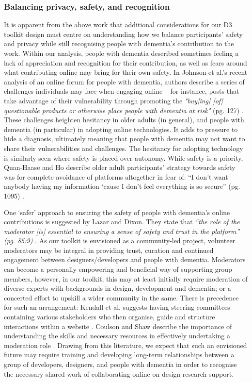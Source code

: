 \subsubsection{Balancing privacy, safety, and recognition}
It is apparent from the above work that additional considerations for our D3 toolkit design must centre on understanding how we balance participants’ safety and privacy while still recognising people with dementia's contribution to the work. Within our analysis, people with dementia described sometimes feeling a lack of appreciation and recognition for their contribution, as well as fears around what contributing online may bring for their own safety. In Johnson et al.’s recent analysis of an online forum for people with dementia, authors describe a series of challenges individuals may face when engaging online – for instance, posts that take advantage of their vulnerability through promoting the \textit{"buy[ing] [of] questionable products or otherwise place people with dementia at risk"} (pg. 127) \citep{johnson2020roles}. These challenges heighten hesitancy in older adults (in general), and people with dementia (in particular) in adopting online technologies. It adds to pressure to hide a diagnosis, ultimately meaning that people with dementia may not want to share their vulnerabilities and challenges. The hesitancy for adopting technology is similarly seen where safety is placed over autonomy. While safety is a priority, Quan-Haase and Ho describe older adult participants’ strategy towards safety was for complete avoidance of platforms altogether in fear of: “I don’t want anybody having my information ‘cause I don’t feel everything is so secure” (pg. 1095) \citep{quan2020online}.

One ‘safer’ approach to ensuring the safety of people with dementia’s online contributions is suggested by Lazar and Dixon. They state that \textit{“the role of the moderator [is] essential to ensuring a sense of safety and trust in the platform” (pg. 85:9) }\citep{lazar_safe_2019}. As our toolkit is envisioned as a community-led project, volunteer moderators may be integral in providing trust, curation and continued engagement between designers/developers and people with dementia. Moderators can become a personally empowering and beneficial way of supporting group members, however, in our toolkit, this may at least initially require moderation of diverse experts with backgrounds in design, development and dementia; or a concerted effort to upskill a wider community in the same. There is precedence for such an arrangement: Kendall et al. suggests having steering committees containing various stakeholders who then organise, guide and structure interactions within a website \citep{kendall2008collaborative}. Coulson and Shaw describe the importance of understanding the skills and necessary resources in effectively undertaking a moderation role \citep{coulson2013nurturing}. Drawing from this literature, we expect that such an envisioned future may require training and developing long-term relationships between a group of developers, designers, and people with dementia in order to recognise the necessary shared work of collaborating online on design research support.

